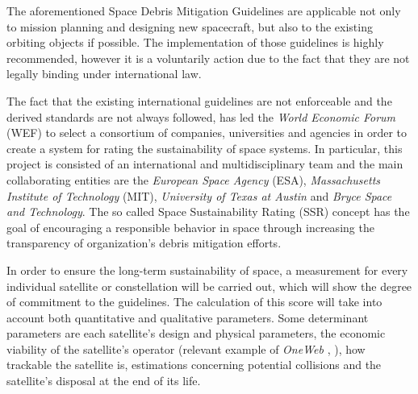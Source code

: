 The aforementioned Space Debris Mitigation Guidelines are applicable not only to mission planning and designing new spacecraft, but also to the existing orbiting objects if possible. The implementation of those guidelines is highly recommended, however it is a voluntarily action due to the fact that they are not legally binding under international law. \cite{UNOOSA}

\bigskip
The fact that the existing international guidelines are not enforceable and the derived standards are not always followed, has led the \textit{World Economic Forum} (WEF) to select a consortium of companies, universities and agencies in order to create a system for rating the sustainability of space systems. \cite{Space sustainability} %
In particular, this project is consisted of an international and multidisciplinary team and the main collaborating entities are the \textit{European Space Agency} (ESA), \textit{Massachusetts Institute of Technology} (MIT), \textit{University of Texas at Austin} and \textit{Bryce Space and Technology}. The so called Space Sustainability Rating (SSR) concept has the goal of encouraging a responsible behavior in space through increasing the transparency of organization's debris mitigation efforts.

In order to ensure the long-term sustainability of space, a measurement for every individual satellite or constellation will be carried out, which will show the degree of commitment to the guidelines. The calculation of this score will take into account both quantitative and qualitative parameters. Some determinant parameters are each satellite's design and physical parameters, the economic viability of the satellite's operator (relevant example of \textit{OneWeb} \cite{Oneweb_bankruptcy}, \cite{Cadman}), %
how trackable the satellite is, estimations concerning potential collisions and the satellite's disposal at the end of its life. \cite{Space sustainability}

